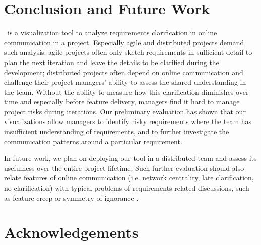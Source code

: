 \section{Conclusion and Future Work}
 \viss\ is a visualization tool to analyze requirements clarification in online communication in a project.
Especially agile and distributed projects demand such analysis: agile projects often only sketch requirements in sufficient detail to plan the next iteration and leave the details to be clarified during the development; distributed projects often depend on online communication and challenge their project managers' ability to assess the shared understanding in the team. 
Without the ability to measure how this clarification diminishes over time and especially before feature delivery, managers find it hard to manage project risks during iterations.
Our preliminary evaluation has shown that our visualizations allow managers to identify risky requirements where the team has insufficient understanding of requirements, and to further investigate the communication patterns around a particular requirement. %
 
In future work, we plan on deploying our tool in a distributed team and assess its usefulness over the entire project lifetime. Such further evaluation should also relate features of online communication (i.e. network centrality, late clarification, no clarification) with typical problems of requirements related discussions, such as feature creep \cite{Jones1996} or symmetry of ignorance \cite{Fischer2000}.




\section*{Acknowledgements}
